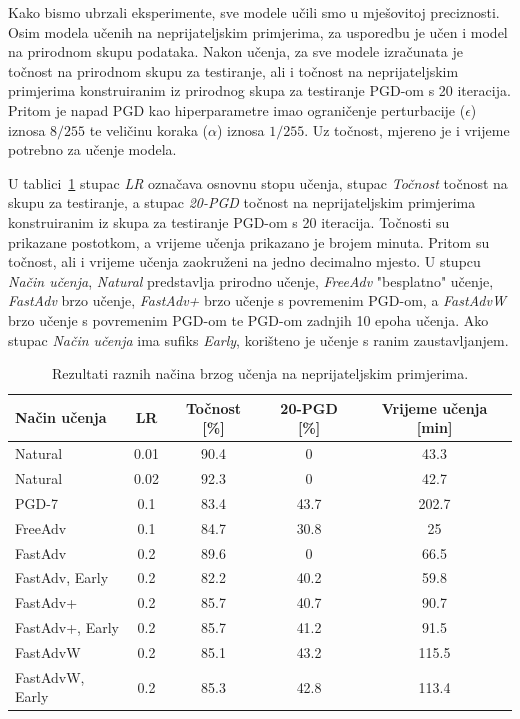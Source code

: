 \documentclass[times, utf8, zavrsni, numeric]{fer}
\begin{document}
Kako bismo ubrzali eksperimente, sve modele učili smo u mješovitoj preciznosti.
Osim modela učenih na neprijateljskim primjerima, za usporedbu je učen i model na prirodnom skupu podataka. Nakon učenja, za sve modele izračunata je točnost na prirodnom skupu za testiranje,
ali i točnost na neprijateljskim primjerima konstruiranim iz prirodnog skupa za testiranje PGD-om s 20 iteracija. 
Pritom je napad PGD kao hiperparametre imao ograničenje perturbacije ($\epsilon$) iznosa $8/255$ te veličinu koraka ($\alpha$) iznosa $1/255$.
Uz točnost, mjereno je i vrijeme potrebno za učenje modela.

\pagebreak

U tablici~\ref{tbl:mjerenja_robusno_ucenje} stupac \textit{LR} označava osnovnu stopu učenja, stupac \textit{Točnost} točnost na skupu za testiranje, a stupac \textit{20-PGD} točnost na neprijateljskim primjerima konstruiranim iz skupa za testiranje PGD-om s 20 iteracija.
Točnosti su prikazane postotkom, a vrijeme učenja prikazano je brojem minuta. Pritom su točnost, ali i vrijeme učenja zaokruženi na jedno decimalno mjesto.
U stupcu \textit{Način učenja}, \textit{Natural} predstavlja prirodno učenje, \textit{FreeAdv} "besplatno" učenje, \textit{FastAdv} brzo učenje, 
\textit{FastAdv+} brzo učenje s povremenim PGD-om, a \textit{FastAdvW} brzo učenje s povremenim PGD-om te PGD-om zadnjih 10 epoha učenja.
Ako stupac \textit{Način učenja} ima sufiks \textit{Early}, korišteno je učenje s ranim zaustavljanjem.

\begin{table}[htb]
    \caption{Rezultati raznih načina brzog učenja na neprijateljskim primjerima.}
    \label{tbl:mjerenja_robusno_ucenje}
    \centering
    \begin{tabular}{lcccc} \hline
    Način učenja & LR & Točnost [\%] & 20-PGD [\%] & Vrijeme učenja [min]\\ \hline
    Natural & 0.01 & 90.4 & 0 & 43.3 \\
    Natural & 0.02 & 92.3 & 0 & 42.7 \\
    PGD-7 & 0.1 & 83.4 & 43.7 & 202.7 \\
    FreeAdv & 0.1 & 84.7 & 30.8 & 25 \\
    FastAdv & 0.2 & 89.6 & 0 & 66.5 \\
    FastAdv, Early & 0.2 & 82.2 & 40.2 & 59.8 \\
    FastAdv+ & 0.2 & 85.7 & 40.7 & 90.7 \\
    FastAdv+, Early & 0.2 & 85.7 & 41.2 & 91.5 \\
    FastAdvW & 0.2 & 85.1 & 43.2 & 115.5 \\
    FastAdvW, Early & 0.2 & 85.3 & 42.8 & 113.4 \\ \hline
    \end{tabular}
\end{table}    
\end{document}
